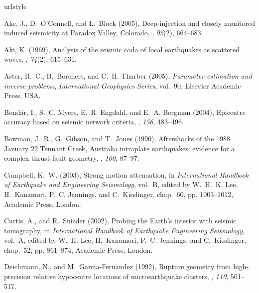 \documentclass[12pt,double]{article}
\begin{document}
\begin{thebibliography}{45}
\providecommand{\natexlab}[1]{#1}
\expandafter\ifx\csname urlstyle\endcsname\relax
  \providecommand{\doi}[1]{doi:\discretionary{}{}{}#1}\else
  \providecommand{\doi}{doi:\discretionary{}{}{}\begingroup
  \urlstyle{rm}\Url}\fi

Ake, J., D.~O'{C}onnell, and L.~Block (2005), Deep-injection and closely
  monitored induced seismicity at {P}aradox {V}alley, {C}olorado,
  \bssa, \textit{95}(2),
  664--683.

Aki, K. (1969), Analysis of the seismic coda of local earthquakes as scattered
  waves, \jgr, \textit{74}(2), 615--631.

Aster, R.~C., B.~Borchers, and C.~H. Thurber (2005), \textit{Parameter
  estimation and inverse problems}, \textit{International Geophysics Series},
  vol.~90, Elsevier Academic Press, USA.

Bond\'ar, I., S.~C. Myers, E.~R. Engdahl, and E.~A. Bergman (2004), Epicentre
  accuracy based on seismic network criteria, \gji, \textit{156}, 483--496.

Bowman, J.~R., G.~Gibson, and T.~Jones (1990), Aftershocks of the 1988
  {J}anuary 22 {T}ennant {C}reek, {A}ustralia intraplate earthquakes: evidence
  for a complex thrust-fault geometry, \gji, \textit{100}, 87--97.

Campbell, K.~W. (2003), Strong motion attenuation, in \textit{International
  Handbook of Earthquake and Engineering Seismology}, vol.~B, edited by
  W.~H.~K. Lee, H.~Kanamori, P.~C. Jennings, and C.~Kisslinger, chap.~60, pp.
  1003--1012, Academic Press, London.

Curtis, A., and R.~Snieder (2002), Probing the {E}arth's interior with seismic
  tomography, in \textit{International Handbook of Earthquake Engineering
  Seismology}, vol.~{A}, edited by W.~H. Lee, H.~Kanamori, P.~C. Jennings, and
  C.~Kisslinger, chap.~52, pp. 861--874, Academic Press, London.

Deichmann, N., and M.~Garcia-{F}ernandez (1992), Rupture geometry from
  high-precision relative hypocentre locations of microearthquake clusters,
  \gji, \textit{110}, 501--517.


\end{thebibliography}
\end{document}

